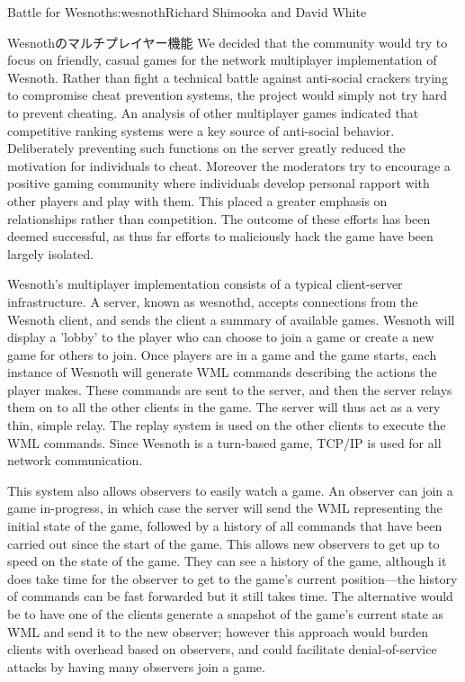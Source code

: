 \begin{aosachapter}{Battle for Wesnoth}{s:wesnoth}{Richard Shimooka and David White}
\begin{aosasect1}{Wesnothのマルチプレイヤー機能}
We decided that the community would try to focus on friendly, casual
games for the network multiplayer implementation of Wesnoth.  Rather
than fight a technical battle against anti-social crackers trying to
compromise cheat prevention systems, the project would simply not try
hard to prevent cheating. An analysis of other multiplayer games
indicated that competitive ranking systems were a key source of
anti-social behavior. Deliberately preventing such functions on the
server greatly reduced the motivation for individuals to cheat.
Moreover the moderators try to encourage a positive gaming community
where individuals develop personal rapport with other players and play
with them. This placed a greater emphasis on relationships rather than
competition. The outcome of these efforts has been deemed successful,
as thus far efforts to maliciously hack the game have been largely
isolated.

Wesnoth's multiplayer implementation consists of a typical
client-server infrastructure. A server, known as wesnothd, accepts
connections from the Wesnoth client, and sends the client a summary of
available games.  Wesnoth will display a 'lobby' to the player who can
choose to join a game or create a new game for others to join. Once
players are in a game and the game starts, each instance of Wesnoth
will generate WML commands describing the actions the player
makes. These commands are sent to the server, and then the server
relays them on to all the other clients in the game. The server will
thus act as a very thin, simple relay. The replay system is used on
the other clients to execute the WML commands.  Since Wesnoth is a
turn-based game, TCP/IP is used for all network communication.

This system also allows observers to easily watch a game. An observer
can join a game in-progress, in which case the server will send the
WML representing the initial state of the game, followed by a history
of all commands that have been carried out since the start of the
game. This allows new observers to get up to speed on the state of
the game. They can see a history of the game, although it does take
time for the observer to get to the game's current position---the
history of commands can be fast forwarded but it still takes
time. The alternative would be to have one of the clients generate a
snapshot of the game's current state as WML and send it to the new
observer; however this approach would burden clients with overhead
based on observers, and could facilitate denial-of-service attacks by
having many observers join a game.


\end{aosasect1}
\end{aosachapter}

